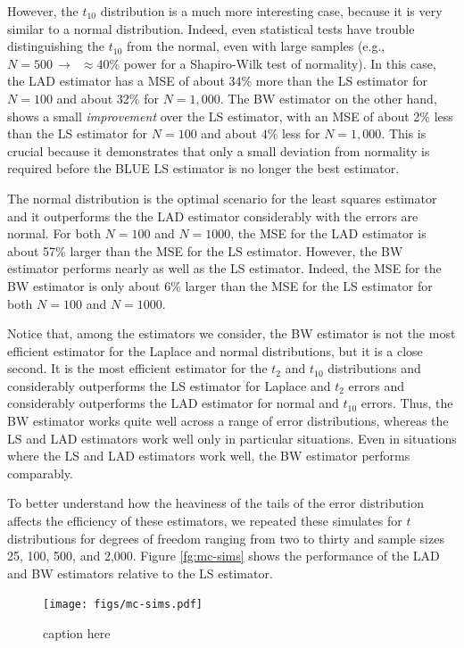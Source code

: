 \documentclass[12pt]{article}
\begin{document}
However, the $t_{10}$ distribution is a much more interesting case, because it is very similar to a normal distribution. Indeed, even statistical tests have trouble distinguishing the $t_{10}$ from the normal, even with large samples (e.g., $N = 500 \, \rightarrow \,\,\, \approx40\% \text{ power}$ for a Shapiro-Wilk test of normality). In this case, the LAD estimator has a MSE of about 34\% more than the LS estimator for $N = 100$ and about 32\% for $N = 1,000$. The BW estimator on the other hand, shows a small \textit{improvement} over the LS estimator, with an MSE of about 2\% less than the LS estimator for $N = 100$ and about $4\%$ less for $N = 1,000$. This is crucial because it demonstrates that only a small deviation from normality is required before the BLUE LS estimator is no longer the best estimator. 

The normal distribution is the optimal scenario for the least squares estimator and it outperforms the the LAD estimator considerably with the errors are normal. For both $N = 100$ and $N = 1000$, the MSE for the LAD estimator is about 57\% larger than the MSE for the LS estimator. However, the BW estimator performs nearly as well as the LS estimator. Indeed, the MSE for the BW estimator is only about 6\% larger than the MSE for the LS estimator for both $N = 100$ and $N = 1000$.

Notice that, among the estimators we consider, the BW estimator is not the most efficient estimator for the Laplace and normal distributions, but it is a close second. It is the most efficient estimator for the $t_2$ and $t_10$ distributions and considerably outperforms the LS estimator for Laplace and $t_2$ errors and considerably outperforms the LAD estimator for normal and $t_{10}$ errors. Thus, the BW estimator works quite well across a range of error distributions, whereas the LS and LAD estimators work well only in particular situations. Even in situations where the LS and LAD estimators work well, the BW estimator performs comparably.

To better understand how the heaviness of the tails of the error distribution affects the efficiency of these estimators, we repeated these simulates for $t$ distributions for degrees of freedom ranging from two to thirty and sample sizes 25, 100, 500, and 2,000. Figure \ref{fg:mc-sims} shows the performance of the LAD and BW estimators relative to the LS estimator.

\begin{figure}[h!]
\begin{center}
\texttt{[image: figs/mc-sims.pdf]}
\caption{caption here}\label{fig:mc-sims}
\end{center}
\end{figure}
\end{document}
